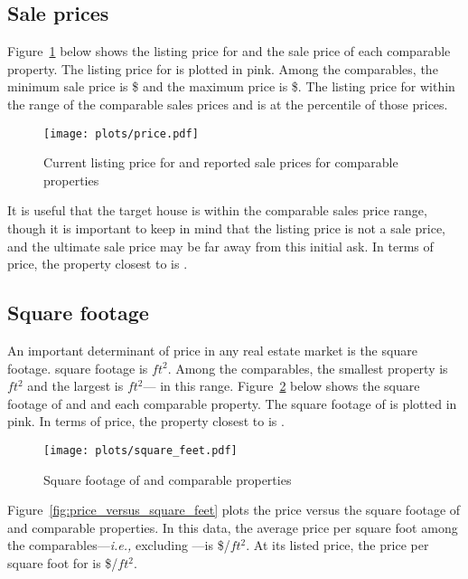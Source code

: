 \documentclass[
12pt, %
letterpaper, %
oneside, %
headinclude,footinclude, %
BCOR5mm, %
]{scrartcl}
\begin{document}
\subsection{Sale prices} 
Figure~\ref{fig:price} below shows the listing price for \PropertyName{} and the sale price of each comparable property.
The listing price for \PropertyName{} is plotted in pink. 
Among the comparables, the minimum sale price is \$\MinPrice{} and the maximum price is \$\MaxPrice{}.
The listing price for \PropertyName{} \InPriceRange{} within the range of the comparable sales prices and is at the \PricePercentile{} percentile of those prices.


\begin{figure}[h!]
\centering
\caption{Current listing price for \PropertyName{} and reported sale prices for comparable properties} 
\label{fig:price}  
\texttt{[image: plots/price.pdf]} 
\end{figure}



It is useful that the target house is within the comparable sales price range, though it is important to keep in mind that the listing price is not a sale price, and the ultimate sale price may be far away from this initial ask.
In terms of price, the property closest to \PropertyName{} is \ClosestOnPrice{}. 

\subsection{Square footage}
An important determinant of price in any real estate market is the square footage.
\PropertyName{} square footage is \PropertySize{} $ft^2$.
Among the comparables, the smallest property is \MinSize{}$ft^2$ and the largest is \MaxSize{}$ft^2$---\PropertyName{} \InSizeRange{} in this range. 
Figure~\ref{fig:square_feet} below shows the square footage of \PropertyName{} and and each comparable property.
The square footage of \PropertyName{} is plotted in pink. 
In terms of price, the property closest to \PropertyName{} is \ClosestOnSize{}.

\begin{figure}[h!]
\centering
\caption{Square footage of \PropertyName{} and comparable properties} \label{fig:square_feet}  
\texttt{[image: plots/square\_feet.pdf]} 
\end{figure}

Figure~\ref{fig:price_versus_square_feet} plots the price versus the square footage of \PropertyName{} and comparable properties.
In this data, the average price per square foot among the comparables---\textit{i.e.,} excluding \PropertyName{}---is \$\MeanPricePerFoot{}/$ft^2$.
At its listed price, the price per square foot for \PropertyName{} is \$\MeanPricePerFootFocal{}/$ft^2$.
\end{document}
